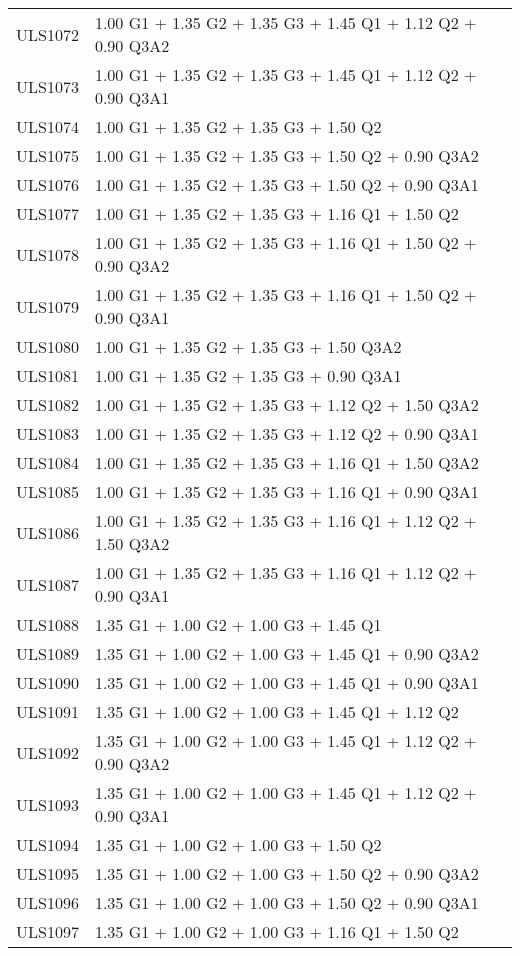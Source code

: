 \begin{center}
\begin{small}
\begin{longtable}{|l|p{10cm}|}
ULS1072 & 1.00 G1 + 1.35 G2 + 1.35 G3 + 1.45 Q1 + 1.12 Q2 + 0.90 Q3A2\\
ULS1073 & 1.00 G1 + 1.35 G2 + 1.35 G3 + 1.45 Q1 + 1.12 Q2 + 0.90 Q3A1\\
ULS1074 & 1.00 G1 + 1.35 G2 + 1.35 G3 + 1.50 Q2\\
ULS1075 & 1.00 G1 + 1.35 G2 + 1.35 G3 + 1.50 Q2 + 0.90 Q3A2\\
ULS1076 & 1.00 G1 + 1.35 G2 + 1.35 G3 + 1.50 Q2 + 0.90 Q3A1\\
ULS1077 & 1.00 G1 + 1.35 G2 + 1.35 G3 + 1.16 Q1 + 1.50 Q2\\
ULS1078 & 1.00 G1 + 1.35 G2 + 1.35 G3 + 1.16 Q1 + 1.50 Q2 + 0.90 Q3A2\\
ULS1079 & 1.00 G1 + 1.35 G2 + 1.35 G3 + 1.16 Q1 + 1.50 Q2 + 0.90 Q3A1\\
ULS1080 & 1.00 G1 + 1.35 G2 + 1.35 G3 + 1.50 Q3A2\\
ULS1081 & 1.00 G1 + 1.35 G2 + 1.35 G3 + 0.90 Q3A1\\
ULS1082 & 1.00 G1 + 1.35 G2 + 1.35 G3 + 1.12 Q2 + 1.50 Q3A2\\
ULS1083 & 1.00 G1 + 1.35 G2 + 1.35 G3 + 1.12 Q2 + 0.90 Q3A1\\
ULS1084 & 1.00 G1 + 1.35 G2 + 1.35 G3 + 1.16 Q1 + 1.50 Q3A2\\
ULS1085 & 1.00 G1 + 1.35 G2 + 1.35 G3 + 1.16 Q1 + 0.90 Q3A1\\
ULS1086 & 1.00 G1 + 1.35 G2 + 1.35 G3 + 1.16 Q1 + 1.12 Q2 + 1.50 Q3A2\\
ULS1087 & 1.00 G1 + 1.35 G2 + 1.35 G3 + 1.16 Q1 + 1.12 Q2 + 0.90 Q3A1\\
ULS1088 & 1.35 G1 + 1.00 G2 + 1.00 G3 + 1.45 Q1\\
ULS1089 & 1.35 G1 + 1.00 G2 + 1.00 G3 + 1.45 Q1 + 0.90 Q3A2\\
ULS1090 & 1.35 G1 + 1.00 G2 + 1.00 G3 + 1.45 Q1 + 0.90 Q3A1\\
ULS1091 & 1.35 G1 + 1.00 G2 + 1.00 G3 + 1.45 Q1 + 1.12 Q2\\
ULS1092 & 1.35 G1 + 1.00 G2 + 1.00 G3 + 1.45 Q1 + 1.12 Q2 + 0.90 Q3A2\\
ULS1093 & 1.35 G1 + 1.00 G2 + 1.00 G3 + 1.45 Q1 + 1.12 Q2 + 0.90 Q3A1\\
ULS1094 & 1.35 G1 + 1.00 G2 + 1.00 G3 + 1.50 Q2\\
ULS1095 & 1.35 G1 + 1.00 G2 + 1.00 G3 + 1.50 Q2 + 0.90 Q3A2\\
ULS1096 & 1.35 G1 + 1.00 G2 + 1.00 G3 + 1.50 Q2 + 0.90 Q3A1\\
ULS1097 & 1.35 G1 + 1.00 G2 + 1.00 G3 + 1.16 Q1 + 1.50 Q2\\

\end{longtable}
\end{small}
\end{center}
